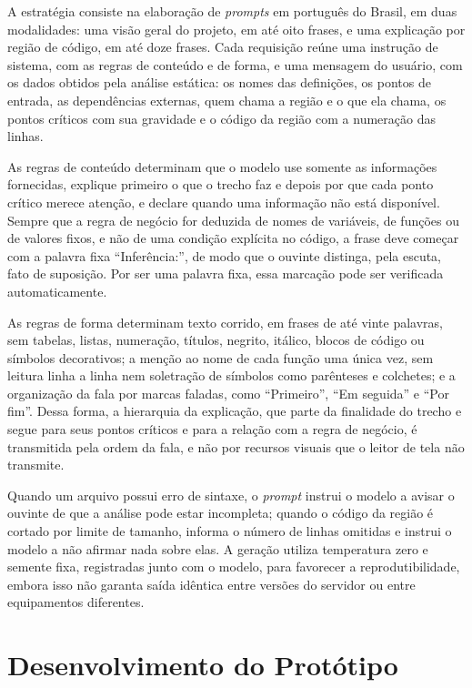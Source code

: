 \documentclass[
    12pt,                   %
    openright,              %
    oneside,                %
    a4paper,                %
    sumario=tradicional,    %
    english,                %
    brazil,                 %
    ]{abntex2}
\begin{document}
A estratégia consiste na elaboração de \textit{prompts} em português do Brasil, em duas modalidades: uma visão geral do projeto, em até oito frases, e uma explicação por região de código, em até doze frases. Cada requisição reúne uma instrução de sistema, com as regras de conteúdo e de forma, e uma mensagem do usuário, com os dados obtidos pela análise estática: os nomes das definições, os pontos de entrada, as dependências externas, quem chama a região e o que ela chama, os pontos críticos com sua gravidade e o código da região com a numeração das linhas.

As regras de conteúdo determinam que o modelo use somente as informações fornecidas, explique primeiro o que o trecho faz e depois por que cada ponto crítico merece atenção, e declare quando uma informação não está disponível. Sempre que a regra de negócio for deduzida de nomes de variáveis, de funções ou de valores fixos, e não de uma condição explícita no código, a frase deve começar com a palavra fixa \enquote{Inferência:}, de modo que o ouvinte distinga, pela escuta, fato de suposição. Por ser uma palavra fixa, essa marcação pode ser verificada automaticamente.

As regras de forma determinam texto corrido, em frases de até vinte palavras, sem tabelas, listas, numeração, títulos, negrito, itálico, blocos de código ou símbolos decorativos; a menção ao nome de cada função uma única vez, sem leitura linha a linha nem soletração de símbolos como parênteses e colchetes; e a organização da fala por marcas faladas, como \enquote{Primeiro}, \enquote{Em seguida} e \enquote{Por fim}. Dessa forma, a hierarquia da explicação, que parte da finalidade do trecho e segue para seus pontos críticos e para a relação com a regra de negócio, é transmitida pela ordem da fala, e não por recursos visuais que o leitor de tela não transmite.

Quando um arquivo possui erro de sintaxe, o \textit{prompt} instrui o modelo a avisar o ouvinte de que a análise pode estar incompleta; quando o código da região é cortado por limite de tamanho, informa o número de linhas omitidas e instrui o modelo a não afirmar nada sobre elas. A geração utiliza temperatura zero e semente fixa, registradas junto com o modelo, para favorecer a reprodutibilidade, embora isso não garanta saída idêntica entre versões do servidor ou entre equipamentos diferentes.

\section{Desenvolvimento do Protótipo}\label{sec:prototipo}
\end{document}

